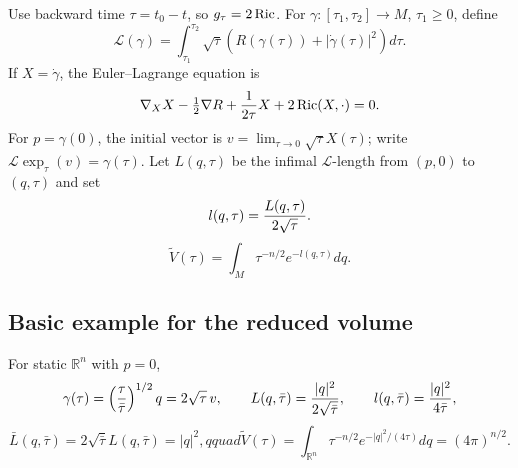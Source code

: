 Use backward time $\tau=t_0-t$, so $g_\tau=2\operatorname{Ric}$. For
$\gamma:[\tau_1,\tau_2]\to M$, $\tau_1\ge0$, define
\begin{equation}\label{defL}
{\mathcal L}(\gamma)=\int_{\tau_1}^{\tau_2}\sqrt\tau\left(R(\gamma(\tau))+|\dot\gamma(\tau)|^2\right)d\tau.
\end{equation}
If $X=\dot\gamma$, the Euler--Lagrange equation is
\begin{equation}
\nabla_XX-\tfrac12\nabla R+{1\over2\tau}X+2\operatorname{Ric}(X,\cdot)=0.
\end{equation}
For $p=\gamma(0)$, the initial vector is $v=\lim_{\tau\to0}\sqrt\tau X(\tau)$;
write ${\mathcal L}\exp_\tau(v)=\gamma(\tau)$. Let $L(q,\tau)$ be the infimal
${\mathcal L}$-length from $(p,0)$ to $(q,\tau)$ and set
\begin{equation}\label{reducedl}l(q,\tau)={L(q,\tau)\over2\sqrt\tau}.
\end{equation}
\begin{equation}\label{reducedv}\tilde V(\tau)=\int_M\tau^{-n/2}e^{-l(q,\tau)}dq.
\end{equation}

\subsection{Basic example for the reduced volume} \label{7Euclidean}
For static $\mathbb R^n$ with $p=0$,
\begin{equation}
\gamma(\tau)=\left({\tau\over\bar\tau}\right)^{1/2}q=2\sqrt\tau\,v,\qquad
L(q,\bar\tau)={|q|^2\over2\sqrt{\bar\tau}},\qquad l(q,\bar\tau)={|q|^2\over4\bar\tau},
\end{equation}
\begin{equation}
\bar L(q,\bar\tau)=2\sqrt{\bar\tau}L(q,\bar\tau)=|q|^2,qquad
\tilde V(\tau)=\int_{\mathbb R^n}\tau^{-n/2}e^{-|q|^2/(4\tau)}dq=(4\pi)^{n/2}.
\end{equation}

